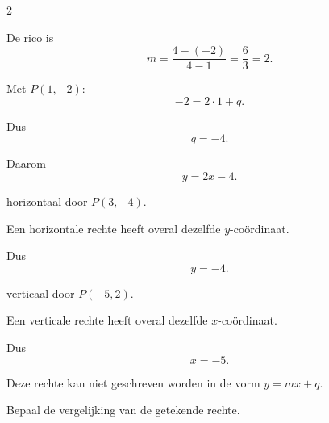 \documentclass{ximera}
\begin{document}
\begin{oefening}{\oefB\ESS}
\begin{multicols}{2}
\begin{question}
\begin{oplossing}
De rico is
\[
m=\frac{4-(-2)}{4-1}
=\frac63
=2.
\]

Met $P(1,-2)$:
\[
-2=2\cdot1+q.
\]

Dus
\[
q=-4.
\]

Daarom
\[
\boxed{y=2x-4}.
\]
\end{oplossing}
\end{question}


\begin{question}
horizontaal door $P(3,-4)$.

\begin{oplossing}
Een horizontale rechte heeft overal dezelfde $y$-coördinaat.

Dus
\[
\boxed{y=-4}.
\]
\end{oplossing}
\end{question}


\begin{question}
verticaal door $P(-5,2)$.

\begin{oplossing}
Een verticale rechte heeft overal dezelfde $x$-coördinaat.

Dus
\[
\boxed{x=-5}.
\]

Deze rechte kan niet geschreven worden in de vorm $y=mx+q$.
\end{oplossing}
\end{question}



\begin{question}

Bepaal de vergelijking van de getekende rechte.

\begin{center}
\end{center}
\end{question}
\end{multicols}
\end{oefening}
\end{document}
